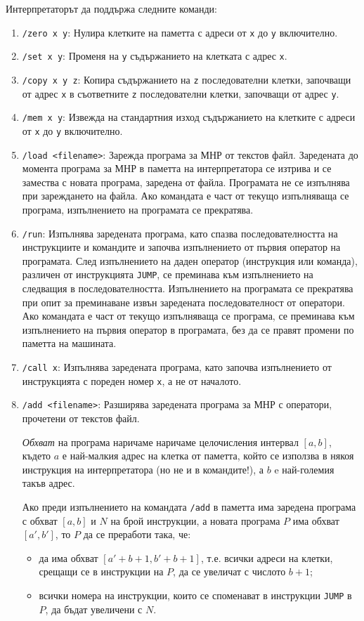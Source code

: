 \documentclass[12pt,a4paper]{article}
\newcommand{\code}[1]{\texttt{#1}}
\begin{document}
{Интерпретаторът да поддържа следните команди:

\begin{enumerate}
    \item \code{/zero x y}: Нулира клетките на паметта с адреси от \code{x} до \code{y} включително.
    \item \code{/set x y}: Променя на \code{y} съдържанието на клетката с адрес \code{x}.
    \item \code{/copy x y z}: Копира съдържанието на \code{z} последователни клетки, започващи от адрес \code{x} в съответните \code{z} последователни клетки, започващи от адрес \code{y}.
    \item \code{/mem x y}: Извежда на стандартния изход съдържанието на клетките с адреси от \code{x} до \code{y} включително.
    \item \code{/load <filename>}: Зарежда програма за МНР от текстов файл. Заредената до момента програма за МНР в паметта на интерпретатора се изтрива и се замества с новата програма, заредена от файла. Програмата не се изпълнява при зареждането на файла. Ако командата е част от текущо изпълняваща се програма, изпълнението на програмата се прекратява.
    \item \code{/run}: Изпълнява заредената програма, като спазва последователността на инструкциите и командите и започва изпълнението от първия оператор на програмата. След изпълнението на даден оператор (инструкция или команда), различен от инструкцията \code{JUMP}, се преминава към изпълнението на следващия в последователността. Изпълнението на програмата се прекратява при опит за преминаване извън заредената последователност от оператори. Ако командата е част от текущо изпълняваща се програма, се преминава към изпълнението на първия оператор в програмата, без да се правят промени по паметта на машината.
    \item \code{/call x}: Изпълнява заредената програма, като започва изпълнението от инструкцията с пореден номер \code{x}, а не от началото.
    \item \code{/add <filename>}: Разширява заредената програма за МНР с оператори, прочетени от текстов файл.

    \emph{Обхват} на програма наричаме наричаме целочисления интервал $[a,b]$, където $a$ е най-малкия адрес на клетка от паметта, който се използва в някоя инструкция на интерпретатора (но не и в командите!), а $b$ e най-големия такъв адрес.

    Ако преди изпълнението на командата \code{/add} в паметта има заредена програма с обхват $[a,b]$ и $N$ на брой инструкции, а новата програма $P$ има обхват $[a',b']$, то $P$ да се преработи така, че:
    \begin{itemize}
    \item да има обхват $[a'+b+1,b'+b+1]$, т.е. всички адреси на клетки, срещащи се в инструкции на $P$, да се увеличат с числото $b+1$;
    \item всички номера на инструкции, които се споменават в инструкции \code{JUMP} в $P$, да бъдат увеличени с $N$.
    \end{itemize}


\end{enumerate}}
\end{document}
